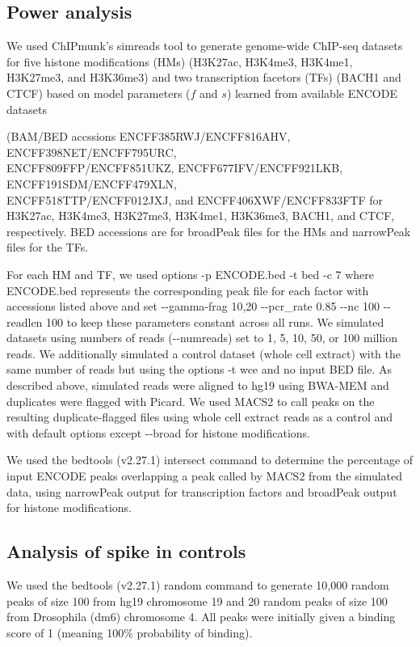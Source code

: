 \documentclass[12pt]{article}
\begin{document}
\subsection*{Power analysis}
We used ChIPmunk's simreads tool to generate genome-wide ChIP-seq datasets for five histone modifications (HMs) (H3K27ac, H3K4me3, H3K4me1, H3K27me3, and H3K36me3) and two transcription facetors (TFs) (BACH1 and CTCF) based on model parameters ($f$ and $s$) learned from available ENCODE datasets

(BAM/BED accssions ENCFF385RWJ/ENCFF816AHV, ENCFF398NET/ENCFF795URC, \\ENCFF809FFP/ENCFF851UKZ, ENCFF677IFV/ENCFF921LKB, ENCFF191SDM/ENCFF479XLN,\\ ENCFF518TTP/ENCFF012JXJ, and ENCFF406XWF/ENCFF833FTF for
H3K27ac, H3K4me3, H3K27me3, H3K4me1, H3K36me3, BACH1, and CTCF, respectively. BED accessions are for broadPeak files for the HMs and narrowPeak files for the TFs.

For each HM and TF, we used options -p ENCODE.bed -t bed -c 7 where ENCODE.bed represents the corresponding peak file for each factor with accessions listed above and set -{}-gamma-frag 10,20 -{}-pcr\_rate 0.85 -{}-nc 100 -{}-readlen 100 to keep these parameters constant across all runs.
We simulated datasets using numbers of reads (-{}-numreads) set to 1, 5, 10, 50, or 100 million reads.
We additionally simulated a control dataset (whole cell extract) with the same number of reads but using the options -t wce and no input BED file. As described above, simulated reads were aligned to hg19 using BWA-MEM and duplicates were flagged with Picard.
We used MACS2 \cite{MACS2} to call peaks on the resulting duplicate-flagged files using whole cell extract reads as a control and with default options except -{}-broad for histone modifications.

We used the bedtools \cite{bedtools} (v2.27.1) intersect command to determine the percentage of input ENCODE peaks overlapping a peak called by MACS2 from the simulated data, using narrowPeak output for transcription factors and broadPeak output for histone modifications.

\subsection*{Analysis of spike in controls}
We used the bedtools \cite{bedtools} (v2.27.1) random command to generate 10,000 random peaks of size 100 from hg19 chromosome 19 and 20 random peaks of size 100 from Drosophila (dm6) chromosome 4. All peaks were initially given a binding score of 1 (meaning 100\% probability of binding).
\end{document}
